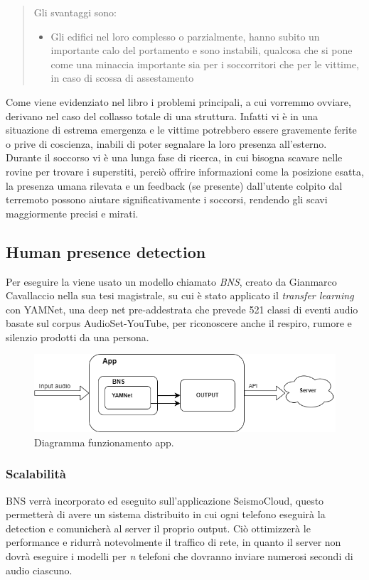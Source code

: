 \documentclass[main.tex]{subfiles}
\begin{document}
\begin{quote}
Gli svantaggi sono:
\begin{itemize}
    \item Gli edifici nel loro complesso o parzialmente, hanno subito un importante calo del portamento e sono instabili, qualcosa che si pone come una minaccia importante sia per i soccorritori che per le vittime, in caso di scossa di assestamento
\end{itemize}
\cite{searchAndRescue}
\end{quote}

Come viene evidenziato nel libro i problemi principali, a cui vorremmo ovviare, derivano nel caso del collasso totale di una struttura. Infatti vi è in una situazione di estrema emergenza e le vittime potrebbero essere gravemente ferite o prive di coscienza, inabili di poter segnalare la loro presenza all'esterno. Durante il soccorso vi è una lunga fase di ricerca, in cui bisogna scavare nelle rovine per trovare i superstiti, perciò offrire informazioni come la posizione esatta, la presenza umana rilevata e un feedback (se presente) dall'utente colpito dal terremoto possono aiutare significativamente i soccorsi, rendendo gli scavi maggiormente precisi e mirati. 

\subsection{Human presence detection}
Per eseguire la  viene usato un modello chiamato \emph{BNS}, creato da Gianmarco Cavallaccio nella sua tesi magistrale\cite{TesiBNS}, su cui è stato applicato il \emph{transfer learning} con YAMNet, una deep net pre-addestrata che prevede 521 classi di eventi audio basate sul corpus AudioSet-YouTube\cite{YAMNet}, per riconoscere anche il respiro, rumore e silenzio prodotti da una persona.
\begin{figure}[H]
    \centering
    \includegraphics[width=1\linewidth]{img/Post-Earthquake/Post-EQ-Detection-Diagram-BNS chart.png}
    \caption{Diagramma funzionamento app.}
    \label{fig:bns-app}
\end{figure}

\subsubsection{Scalabilità}
BNS verrà incorporato ed eseguito sull'applicazione SeismoCloud, questo permetterà di avere un sistema distribuito in cui ogni telefono eseguirà la detection e comunicherà al server il proprio output. Ciò ottimizzerà le performance e ridurrà notevolmente il traffico di rete, in quanto il server non dovrà eseguire i modelli per \emph{n} telefoni che dovranno inviare numerosi secondi di audio ciascuno.
\end{document}
